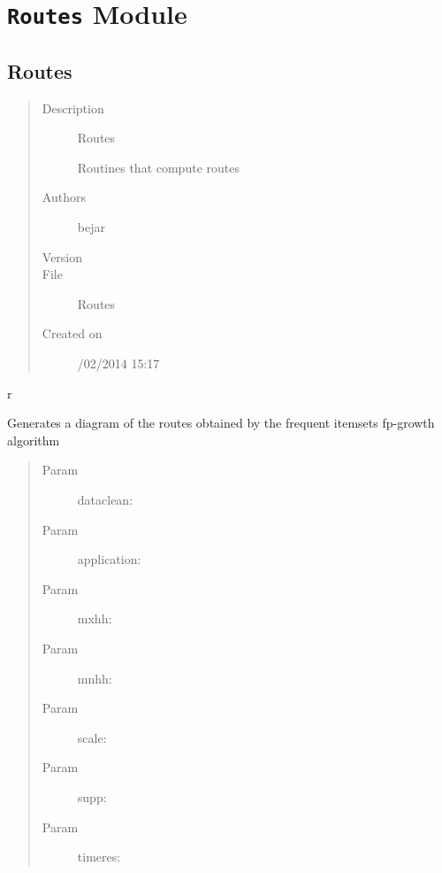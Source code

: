 \documentclass[letterpaper,10pt,english]{sphinxmanual}
\begin{document}
\chapter{\texttt{Routes} Module}
\label{index:routes-module}\label{index:module-SuperHub.Routes}\label{index:module-Routes}

\section{Routes}
\label{index:routes}\begin{quote}\begin{description}
\item[{Description}] \leavevmode
Routes

Routines that compute routes

\item[{Authors}] \leavevmode
bejar

\item[{Version}] 

\item[{File}] \leavevmode
Routes

\item[{Created on}] /02/2014 15:17

\end{description}\end{quote}

r

\begin{fulllineitems}
\label{index:SuperHub.Routes.transaction_routes}
Generates a diagram of the routes obtained by the frequent itemsets fp-growth algorithm
\begin{quote}\begin{description}
\item[{Param }] \leavevmode
dataclean:

\item[{Param }] \leavevmode
application:

\item[{Param }] \leavevmode
mxhh:

\item[{Param }] \leavevmode
mnhh:

\item[{Param }] \leavevmode
scale:

\item[{Param }] \leavevmode
supp:

\item[{Param }] \leavevmode
timeres:

\end{description}\end{quote}

\end{fulllineitems}
\end{document}

